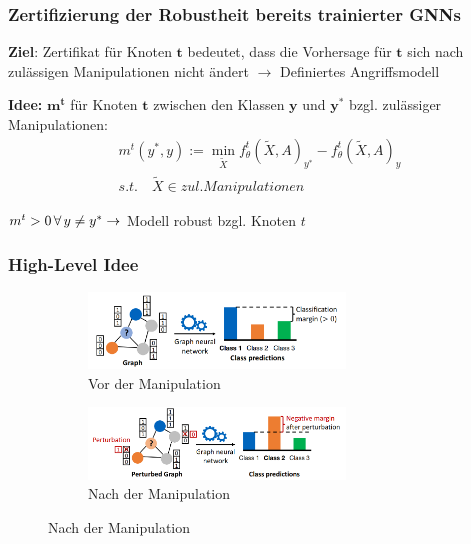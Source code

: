 \documentclass{beamer}
\begin{document}
\begin{frame}
  \frametitle{Zertifizierung der Robustheit bereits trainierter GNNs}

  \textbf{Ziel}: Zertifikat für Knoten $\boldsymbol{t}$ bedeutet, dass die Vorhersage für $\boldsymbol{t}$ sich nach zulässigen Manipulationen nicht ändert\newline
  $\rightarrow$ Definiertes Angriffsmodell\newline

  \textbf{Idee:}
   $\boldsymbol{m^t}$ für Knoten $\boldsymbol{t}$ zwischen den Klassen $\boldsymbol{y}$ und $\boldsymbol{y^{\ast}}$ 
  bzgl. zulässiger Manipulationen:
  \begin{gather} 
        m^t (y^*, y) := \min_{\tilde{X}} f_{\theta}^t(\tilde{X}, A)_{y^*} - f_{\theta}^t(\tilde{X}, A)_y \nonumber \\
        s.t. \quad \tilde{X} \in zul. Manipulationen \nonumber
  \end{gather}

  $m^t > 0 \thinspace \forall \thinspace y \neq y^{\ast} \rightarrow $ Modell robust bzgl. Knoten $t$

\end{frame}

\begin{frame}
  \frametitle{High-Level Idee}
  \begin{figure}[H]
    \centering
    \begin{subfigure}[b]{1\textwidth}
      \centering
      \includegraphics[width=0.75\textwidth]{img/before_pert.png}
      \caption*{Vor der Manipulation \cite{Zuegner_2019}}
    \end{subfigure}
    \par\bigskip
    \begin{subfigure}[b]{1\textwidth}
      \centering
      \includegraphics[width=0.75\textwidth]{img/after_pert.png}
      \caption*{Nach der Manipulation \cite{Zuegner_2019}}
    \end{subfigure}
  \end{figure}
\end{frame}
\end{document}

